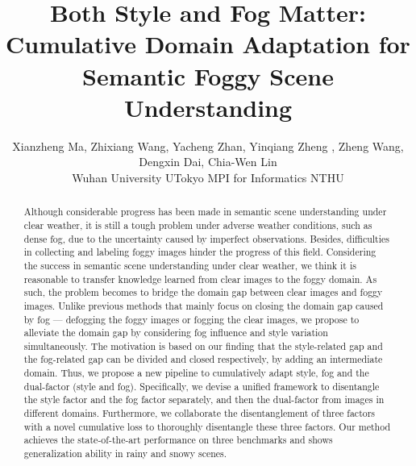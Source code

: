 \documentclass[10pt,twocolumn,letterpaper]{article}
\begin{document}
\title{Both Style and Fog Matter:\\Cumulative Domain Adaptation for Semantic Foggy Scene Understanding}

\author{Xianzheng Ma, \hspace{1mm}Zhixiang Wang, \hspace{1mm}Yacheng Zhan, \hspace{1mm}Yinqiang Zheng , \hspace{1mm}Zheng Wang, \\Dengxin Dai, \hspace{1mm}Chia-Wen Lin\\
Wuhan University  \hspace{3mm}  UTokyo  \hspace{3mm}  MPI for Informatics  \hspace{3mm}  NTHU\\




}
\maketitle

\begin{abstract}
Although considerable progress has been made in semantic scene understanding under clear weather, it is still a tough problem under adverse weather conditions, such as dense fog, due to the uncertainty caused by imperfect observations. Besides, difficulties in collecting and labeling foggy images hinder the progress of this field.
Considering the success in semantic scene understanding under clear weather, we think it is reasonable to transfer knowledge learned from clear images to the foggy domain. As such, the problem becomes to bridge the domain gap between clear images and foggy images. 
Unlike previous methods that mainly focus on closing the domain gap caused by fog --- defogging the foggy images or fogging the clear images, we propose to alleviate the domain gap by considering fog influence and style variation simultaneously. 
The motivation is based on our finding that the style-related gap and the fog-related gap can be divided and closed respectively, by adding an intermediate domain.
Thus, we propose a new pipeline to cumulatively adapt style, fog and the dual-factor (style and fog). Specifically, we devise a unified framework to disentangle the style factor and the fog factor separately, and then the dual-factor from images in different domains. 
Furthermore, we collaborate the disentanglement of three factors with a novel cumulative loss to thoroughly disentangle these three factors. 
Our method achieves the state-of-the-art performance on three benchmarks and shows generalization ability in rainy and snowy scenes.
\end{abstract}
\end{document}
